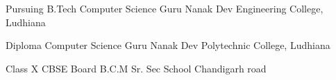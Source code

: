     {Pursuing B.Tech}
    {Computer Science}
    {Guru Nanak Dev Engineering College, Ludhiana}
    {}
    {}

    {Diploma}
    {Computer Science}
    {Guru Nanak Dev Polytechnic College, Ludhiana}
    {}
    {}

    {Class X}
    {CBSE Board}
    {B.C.M Sr. Sec School Chandigarh road}
    {}
    {}
